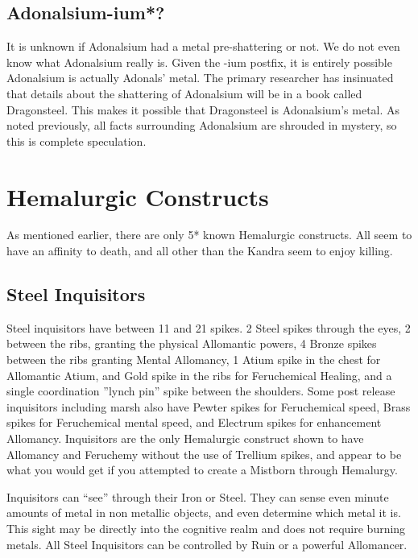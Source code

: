 \documentclass[conference]{IEEEtran}
\begin{document}
\subsection*{\textbf{Adonalsium-ium}*?}
It is unknown if Adonalsium had a metal pre-shattering or not.  We do not even know what Adonalsium really is.  Given the -ium postfix, it is entirely possible Adonalsium is actually Adonals' metal.  The primary researcher has insinuated that details about the shattering of Adonalsium will be in a book called Dragonsteel.  This makes it possible that Dragonsteel is Adonalsium's metal.
As noted previously, all facts surrounding Adonalsium are shrouded in mystery, so this is complete speculation.
\\

\section{\textbf{Hemalurgic Constructs}}
As mentioned earlier, there are only 5* known Hemalurgic constructs.  All seem to have an affinity to death,\cite{WoA-CH19}\cite{WoF}\cite{HoA-CH69}\cite{SoS-CH21}\cite{TFE-EP}\cite{WoA-CH11}\cite{TFE-CH34} and all other than the Kandra seem to enjoy killing.\cite{HoA-CH11}
\subsection*{\textbf{Steel Inquisitors}}
Steel inquisitors have between 11 and 21 spikes.\cite{TFE-EP}\cite{HoA-CH13}  2 Steel spikes through the eyes,\cite{TFE-CH2} 2 between the ribs, granting the physical Allomantic powers,\cite{HoA-CH5} 4 Bronze spikes between the ribs granting Mental Allomancy,\cite{HoA-CH13} 1 Atium spike in the chest for Allomantic Atium, and Gold spike in the ribs for Feruchemical Healing,\cite{HoA-CH72} and a single coordination ''lynch pin'' spike between the shoulders.\cite{TFE-CH38}\cite{ARS-TLM} Some post release inquisitors including marsh also have Pewter spikes for Feruchemical speed,\cite{HoA-CH5} Brass spikes for Feruchemical mental speed,\cite{IN-Ms} and Electrum spikes for enhancement Allomancy.\cite{HoA-CH72}  Inquisitors are the only Hemalurgic construct shown to have Allomancy and Feruchemy without the use of Trellium spikes, and appear to be what you would get if you attempted to create a Mistborn through Hemalurgy.

Inquisitors can ``see'' through their Iron or Steel.\cite{TFE-CH36}  They can sense even minute amounts of metal in non metallic objects, and even determine which metal it is.\cite{HoA-pre}\cite{HoA-CH34}  This sight may be directly into the cognitive realm and does not require burning metals.\cite{TLM-3WAD} 
All Steel Inquisitors can be controlled by Ruin\cite{HoA-CH13} or a powerful Allomancer.\cite{HoA-CH71}
\end{document}
